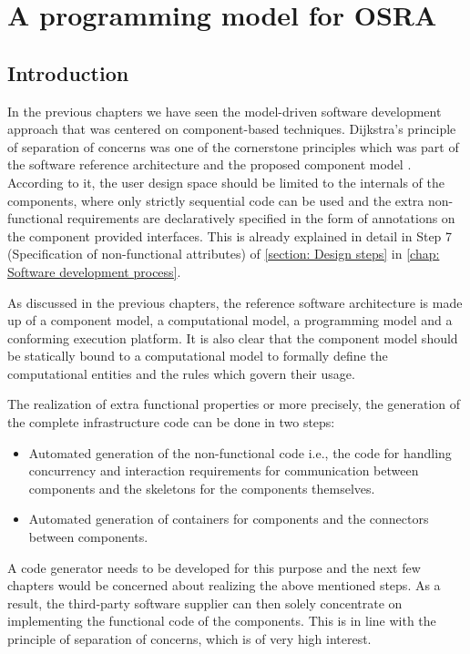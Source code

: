
\chapter{A programming model for OSRA}
\label{chap: Progamming model}

\section{Introduction}
In the previous chapters we have seen the model-driven software development approach that was centered on component-based techniques. Dijkstra's principle of separation of concerns was one of the cornerstone principles which was part of the software reference architecture and the proposed component model \cite{CompBasedProcess}\cite{EvoRAVCodeAr}. According to it, the user design space should be limited to the internals of the components, where only strictly sequential code can be used and the extra non-functional requirements are declaratively specified in the form of annotations on the component provided interfaces. This is already explained in detail in Step 7 (Specification of non-functional attributes) of \cref{section: Design steps} in \cref{chap: Software development process}. 

As discussed in the previous chapters, the reference software architecture is made up of a component model, a computational model, a programming model and a conforming execution platform. It is also clear that the component model should be statically bound to a computational model to formally define the computational entities and the rules which govern their usage.

The realization of extra functional properties or more precisely, the generation of the complete infrastructure code can be done in two steps:
\begin{itemize}
\item Automated generation of the non-functional code i.e., the code for handling concurrency and interaction requirements for communication between components and the skeletons for the components themselves.
\item Automated generation of containers for components and the connectors between components. 
\end{itemize}

A code generator needs to be developed for this purpose and the next few chapters would be concerned about realizing the above mentioned steps. As a result, the third-party software supplier can then solely concentrate on implementing the functional code of the components. This is in line with the principle of separation of concerns, which is of very high interest.

